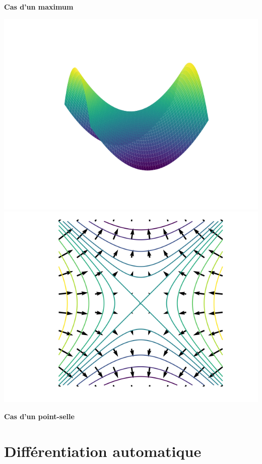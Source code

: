 \begin{center}
\begin{minipage}{0.30\textwidth}
		\quad\textbf{Cas d'un maximum}
	\end{minipage}
	\begin{minipage}{0.30\textwidth}
		\center
		\includegraphics[scale=\myscale,scale=0.35]{figures/gradient-surface-3c}\\
		
		\includegraphics[scale=\myscale,scale=0.35]{figures/gradient-surface-5c}
		
		\quad\textbf{Cas d'un point-selle}
	\end{minipage}
\end{center}

\section{Différentiation automatique}

